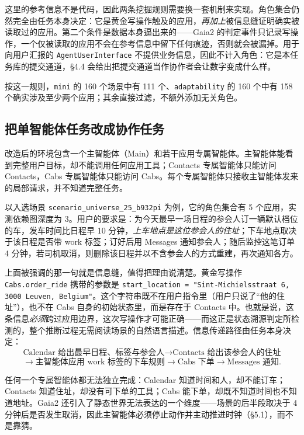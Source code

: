 \documentclass[UTF8,11pt,fontset=fandol]{ctexart}
\begin{document}
这里的参考信息不是代码，因此两条挖掘规则需要换一套机制来实现。角色集合仍然完全由任务本身决定：它是黄金写操作触及的应用，\emph{再加上}被信息缝证明确实被读取过的应用。第二个条件是数据本身逼出来的——Gaia2 的判定事件只记录写操作，一个仅被读取的应用不会在参考信息中留下任何痕迹，否则就会被漏掉。用于向用户汇报的 \texttt{AgentUserInterface} 不提供业务信息，因此不计入角色：它是本任务库的提交通道，\S4.4 会给出把提交通道当作协作者会让数字变成什么样。

按这一规则，\texttt{mini} 的 160 个场景中有 111 个、\texttt{adaptability} 的 160 个中有 158 个确实涉及至少两个应用；其余直接过滤，不额外添加无关角色。

\subsection{把单智能体任务改成协作任务}

改造后的环境包含一个主智能体（Main）和若干应用专属智能体。主智能体能看到完整用户目标，却不能调用任何应用工具；Contacts 专属智能体只能访问 Contacts，Cabs 专属智能体只能访问 Cabs。每个专属智能体只接收主智能体发来的局部请求，并不知道完整任务。

以入选场景 \texttt{scenario\_universe\_25\_b932pi} 为例，它的角色集合有 5 个应用，实测依赖图深度为 3。用户的要求是：为今天最早一场日程的参会人订一辆默认档位的车，发车时间比日程早 10 分钟，\emph{上车地点是这位参会人的住址}；下车地点取决于该日程是否带 work 标签；订好后用 Messages 通知参会人；随后监控这笔订单 4 分钟，若司机取消，则删除该日程并以不含参会人的方式重建，再次通知各方。

上面被强调的那一句就是信息缝，值得把理由说清楚。黄金写操作 \texttt{Cabs.order\_ride} 携带的参数是 \texttt{start\_location = "Sint-Michielsstraat 6, 3000 Leuven, Belgium"}。这个字符串既不在用户指令里（用户只说了“他的住址”），也不在 Cabs 自身的初始状态里，而是存在于 Contacts 中。也就是说，这条信息\emph{必须}跨过应用边界，这次写操作才可能正确——而这正是状态溯源判定所检测的，整个推断过程无需阅读场景的自然语言描述。信息传递路径由任务本身决定：
\[
  \text{Calendar 给出最早日程、标签与参会人}
  \longrightarrow
  \text{Contacts 给出该参会人的住址}
\]
\[
  \longrightarrow
  \text{主智能体应用 work 标签的下车规则}
  \longrightarrow
  \text{Cabs 下单}
  \longrightarrow
  \text{Messages 通知}.
\]

任何一个专属智能体都无法独立完成：Calendar 知道时间和人，却不能订车；Contacts 知道住址，却没有可下单的工具；Cabs 能下单，却既不知道时间也不知道地址。Gaia2 还引入了静态世界无法表达的一个维度——场景的后半段取决于 4 分钟后是否发生取消，因此主智能体必须停止动作并主动推进时钟（\S5.1），而不是靠猜。
\end{document}
